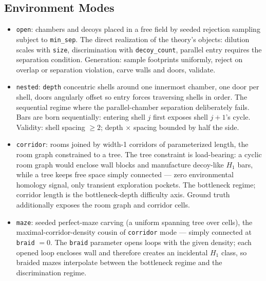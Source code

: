 \documentclass[11pt]{article}
\newcommand{\Hm}[1]{H_{#1}}
\begin{document}
\subsection{Environment Modes}
\label{sec:modes}

\begin{itemize}[leftmargin=2em, itemsep=2pt]
  \item \texttt{open}: chambers and decoys placed in a free field by
        seeded rejection sampling subject to \texttt{min\_sep}. The
        direct realization of the theory's objects: dilution scales
        with \texttt{size}, discrimination with
        \texttt{decoy\_count}, parallel entry requires the separation
        condition. Generation: sample footprints uniformly, reject
        on overlap or separation violation, carve walls and doors,
        validate.
  \item \texttt{nested}: \texttt{depth} concentric shells around one
        innermost chamber, one door per shell, doors angularly offset
        so entry forces traversing shells in order. The sequential
        regime where the parallel-chamber separation deliberately
        fails. Bars are born sequentially: entering shell $j$ first
        exposes shell $j{+}1$'s cycle. Validity: shell spacing
        $\geq 2$; depth $\times$ spacing bounded by half the side.
  \item \texttt{corridor}: rooms joined by width-1 corridors of
        parameterized length, the room graph constrained to a tree.
        The tree constraint is load-bearing: a cyclic room graph
        would enclose wall blocks and manufacture decoy-like $\Hm{1}$
        bars, while a tree keeps free space simply connected --- zero
        environmental homology signal, only transient exploration
        pockets. The bottleneck regime; corridor length is the
        bottleneck-depth difficulty axis. Ground truth additionally
        exposes the room graph and corridor cells.
  \item \texttt{maze}: seeded perfect-maze carving (a uniform
        spanning tree over cells), the maximal-corridor-density
        cousin of \texttt{corridor} mode --- simply connected at
        \texttt{braid} $= 0$. The \texttt{braid} parameter opens
        loops with the given density; each opened loop encloses wall
        and therefore creates an incidental $\Hm{1}$ class, so
        braided mazes interpolate between the bottleneck regime and
        the discrimination regime.
\end{itemize}
\end{document}
